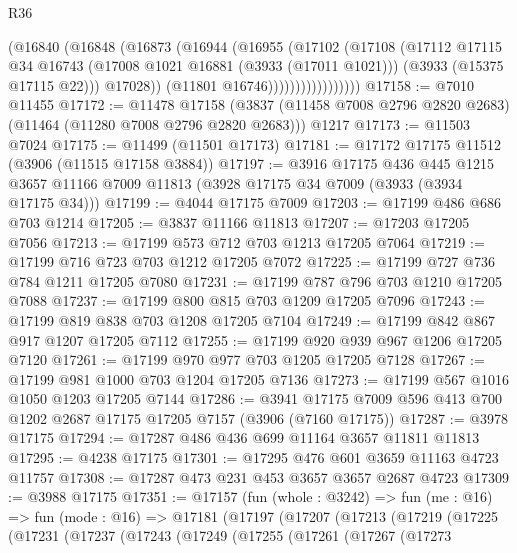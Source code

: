 \begin{lexlean}{R36}
\begin{coremodule}
                          (@16840
                            (@16848
                              (@16873
                                (@16944
                                  (@16955
                                    (@17102
                                      (@17108
                                        (@17112
                                          @17115
                                          @34
                                          @16743
                                          (@17008 @1021 @16881 (@3933 (@17011 @1021)))
                                          (@3933 (@15375 @17115 @22)))
                                        @17028))
                                    (@11801 @16746)))))))))))))))))
@17158 := @7010 @11455
@17172 := @11478
    @17158
    (@3837 (@11458 @7008 @2796 @2820 @2683) (@11464 (@11280 @7008 @2796 @2820 @2683)))
    @1217
@17173 := @11503 @7024
@17175 := @11499 (@11501 @17173)
@17181 := @17172 @17175 @11512 (@3906 (@11515 @17158 @3884))
@17197 := @3916
    @17175
    @436
    @445
    @1215
    @3657
    @11166
    @7009
    @11813
    (@3928 @17175 @34 @7009 (@3933 (@3934 @17175 @34)))
@17199 := @4044 @17175 @7009
@17203 := @17199 @486 @686 @703 @1214
@17205 := @3837 @11166 @11813
@17207 := @17203 @17205 @7056
@17213 := @17199 @573 @712 @703 @1213 @17205 @7064
@17219 := @17199 @716 @723 @703 @1212 @17205 @7072
@17225 := @17199 @727 @736 @784 @1211 @17205 @7080
@17231 := @17199 @787 @796 @703 @1210 @17205 @7088
@17237 := @17199 @800 @815 @703 @1209 @17205 @7096
@17243 := @17199 @819 @838 @703 @1208 @17205 @7104
@17249 := @17199 @842 @867 @917 @1207 @17205 @7112
@17255 := @17199 @920 @939 @967 @1206 @17205 @7120
@17261 := @17199 @970 @977 @703 @1205 @17205 @7128
@17267 := @17199 @981 @1000 @703 @1204 @17205 @7136
@17273 := @17199 @567 @1016 @1050 @1203 @17205 @7144
@17286 := @3941 @17175 @7009 @596 @413 @700 @1202 @2687 @17175 @17205 @7157 (@3906 (@7160 @17175))
@17287 := @3978 @17175
@17294 := @17287 @486 @436 @699 @11164 @3657 @11811 @11813
@17295 := @4238 @17175
@17301 := @17295 @476 @601 @3659 @11163 @4723 @11757
@17308 := @17287 @473 @231 @453 @3657 @3657 @2687 @4723
@17309 := @3988 @17175
@17351 := @17157
    (fun (whole : @3242) =>
    fun (me : @16) =>
    fun (mode : @16) =>
    @17181
      (@17197
        (@17207
          (@17213
            (@17219
              (@17225
                (@17231
                  (@17237
                    (@17243
                      (@17249
                        (@17255
                          (@17261
                            (@17267
                              (@17273

\end{coremodule}
\end{lexlean}
